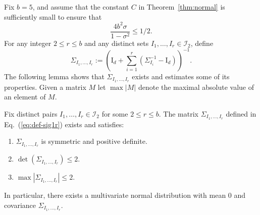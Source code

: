 \documentclass[final, 12pt]{colt2018}
\renewcommand{\eqref}[1]{Eq.~(\ref{#1})}
\begin{document}
Fix $b = 5$, and assume that the constant $C$ in Theorem~\ref{thm:normal} is sufficiently small to ensure that
\begin{equation} \label{eq:sigmab}
\frac{4b^2 \sigma}{1-\sigma^2} \le 1/2.
\end{equation}
For any integer $2 \le r \le b$ and any distinct sets $I_1,\dots, I_r \in \mathcal{I}_2$, define
\begin{equation} \label{eq:def-sig1r}
\Sigma_{I_1,\dots,I_r} := \left( \mathrm{I}_d + \sum_{i=1}^r \left(\Sigma_{I_i}^{-1} - \mathrm{I}_d \right)\right)^{-1}.
\end{equation}
The following lemma shows that $\Sigma_{I_1,\dots,I_r}$ exists and estimates some of its properties.
Given a matrix $M$ let $\max \lvert M \rvert$ denote the maximal absolute value of an element of $M$.

\begin{lemma} \label{lem:g-det}
Fix distinct pairs $I_1,\dots,I_r \in \mathcal{I}_2$ for some $2 \le r \le b$. The matrix $\Sigma_{I_1,\dots,I_r}$ defined in \eqref{eq:def-sig1r} exists and satisfies:
\begin{enumerate}
\item $\Sigma_{I_1,\dots, I_r}$ is symmetric and positive definite. \label{itm:pdsym}
\item \label{itm:det}
$
\det \left(\Sigma_{I_1,\dots,I_r} \right) 
\le 2
$.
\item \label{itm:inf}
$
\max \left\lvert \Sigma_{I_1,\dots,I_r} \right\rvert
\le 2
$.
\end{enumerate}
In particular, there exists a multivariate normal distribution with mean $0$ and covariance $\Sigma_{I_1,\dots,I_r}$.
\end{lemma}
\end{document}
